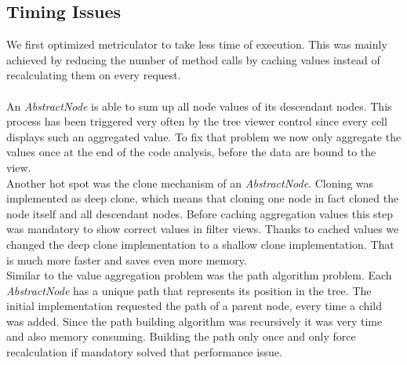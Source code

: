 \documentclass[11pt,a4paper,oneside]{scrreprt}
\begin{document}
\subsection{Timing Issues}
We first optimized metriculator to take less time of execution. This was mainly achieved by reducing the number of method calls by caching values instead of recalculating them on every request.
\\\\
An \textit{AbstractNode} is able to sum up all node values of its descendant nodes. This process has been triggered very often by the tree viewer control since every cell displays such an aggregated value. To fix that problem we now only aggregate the values once at the end of the code analysis, before the data are bound to the view.\\
Another hot spot was the clone mechanism of an \textit{AbstractNode}. Cloning was implemented as deep clone, which means that cloning one node in fact cloned the node itself and all descendant nodes. Before caching aggregation values this step was mandatory to show correct values in filter views. Thanks to cached values we changed the deep clone implementation to a shallow clone implementation. That is much more faster and saves even more memory.\\
Similar to the value aggregation problem was the path algorithm problem. Each \textit{AbstractNode} has a unique path that represents its position in the tree. The initial implementation requested the path of a parent node, every time a child was added. Since the path building algorithm was recursively it was very time and also memory consuming. Building the path only once and only force recalculation if mandatory solved that performance issue.
\end{document}
